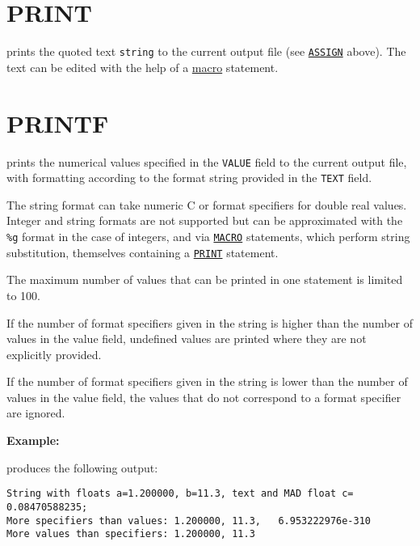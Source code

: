 \section{PRINT}
\label{sec:print}
prints the quoted text \texttt{string} to the current output file (see
\hyperref[sec:assign]{\texttt{ASSIGN}} above). The text can be edited
with the help of a \hyperref[sec:macro]{macro} statement.


\section{PRINTF}
\label{sec:printf}
prints the numerical values specified in the \texttt{VALUE} field to the
current output file, with formatting according to the format string
provided in the \texttt{TEXT} field. 

The string format can take numeric C or \madx format specifiers for
double real values. Integer and string formats are not supported but 
can be approximated with the \texttt{\%g} format in the case of
integers, and via \hyperref[sec:macro]{\texttt{MACRO}} statements, which
perform string substitution, themselves containing a
\hyperref[sec:print]{\texttt{PRINT}} statement.   

The maximum number of values that can be printed in one
statement is limited to 100. 

If the number of format specifiers given in the string is higher 
than the number of values in the value field, undefined values are
printed where they are not explicitly provided. 

If the number of format specifiers given in the string is lower 
than the number of values in the value field, the values that 
do not correspond to a format specifier are ignored. 


\textbf{Example:}
{\small
{}}

produces the following output:
\begin{verbatim}
String with floats a=1.200000, b=11.3, text and MAD float c=  0.08470588235;
More specifiers than values: 1.200000, 11.3,   6.953222976e-310
More values than specifiers: 1.200000, 11.3
\end{verbatim}

